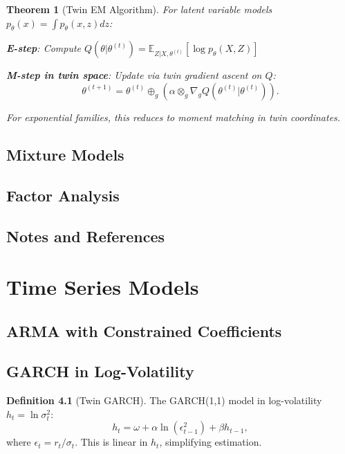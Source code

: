\documentclass[11pt,twoside]{book}
\theoremstyle{plain}
\newtheorem{theorem}{Theorem}[chapter]
\theoremstyle{definition}
\newtheorem{definition}[theorem]{Definition}
\theoremstyle{remark}
\newcommand{\E}{\mathbb{E}}
\newcommand{\tplus}{\oplus_g}
\newcommand{\ttimes}{\otimes_g}
\newcommand{\nablg}{\nabla_g}
\begin{document}
\begin{theorem}[Twin EM Algorithm]
    \label{thm:twin_em}
    For latent variable models $p_\theta(x) = \int p_\theta(x, z) dz$:
    
    \textbf{E-step}: Compute $Q(\theta | \theta^{(t)}) = \E_{Z|X,\theta^{(t)}}[\log p_\theta(X, Z)]$
    
    \textbf{M-step in twin space}: Update via twin gradient ascent on $Q$:
    \[
    \theta^{(t+1)} = \theta^{(t)} \tplus (\alpha \ttimes \nablg Q(\theta^{(t)} | \theta^{(t)})).
    \]
    
    For exponential families, this reduces to moment matching in twin coordinates.
\end{theorem}

\section{Mixture Models}
\label{sec:mixtures}

\section{Factor Analysis}
\label{sec:factor}

\section{Notes and References}
\label{sec:ch14_notes}


\chapter{Time Series Models}
\label{ch:time_series}

\section{ARMA with Constrained Coefficients}
\label{sec:arma}

\section{GARCH in Log-Volatility}
\label{sec:garch}

\begin{definition}[Twin GARCH]
    The GARCH(1,1) model in log-volatility $h_t = \ln \sigma_t^2$:
    \[
    h_t = \omega + \alpha \ln(\epsilon_{t-1}^2) + \beta h_{t-1},
    \]
    where $\epsilon_t = r_t / \sigma_t$. This is linear in $h_t$, simplifying estimation.
\end{definition}
\end{document}
